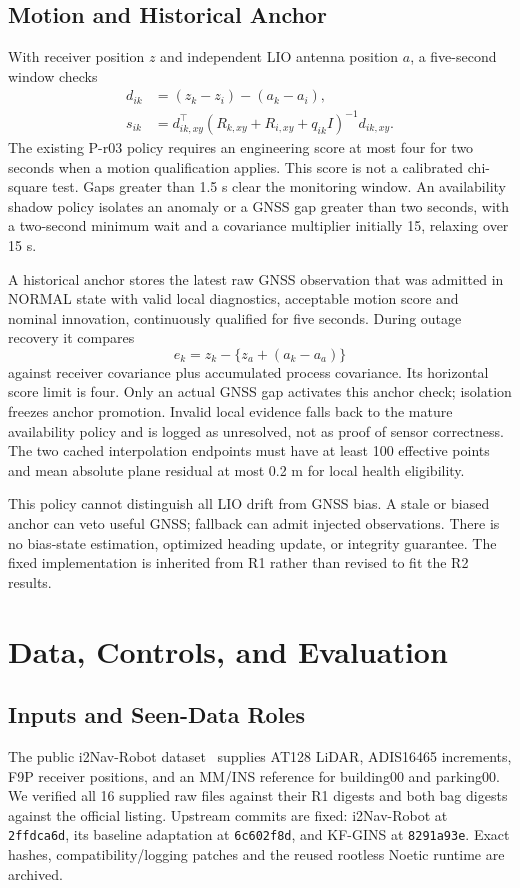 \documentclass[conference]{IEEEtran}
\begin{document}
\subsection{Motion and Historical Anchor}
With receiver position $z$ and independent LIO antenna position $a$, a five-second window checks
\begin{align}
 d_{ik}&=(z_k-z_i)-(a_k-a_i),\\
 s_{ik}&=d_{ik,xy}^{\top}(R_{k,xy}+R_{i,xy}+q_{ik}I)^{-1}d_{ik,xy}.
\end{align}
The existing P-r03 policy requires an engineering score at most four for two seconds when a motion qualification applies. This score is not a calibrated chi-square test. Gaps greater than 1.5 s clear the monitoring window. An availability shadow policy isolates an anomaly or a GNSS gap greater than two seconds, with a two-second minimum wait and a covariance multiplier initially 15, relaxing over 15 s.

A historical anchor stores the latest raw GNSS observation that was admitted in NORMAL state with valid local diagnostics, acceptable motion score and nominal innovation, continuously qualified for five seconds. During outage recovery it compares
\begin{equation}
 e_k=z_k-\{z_a+(a_k-a_a)\}
\end{equation}
against receiver covariance plus accumulated process covariance. Its horizontal score limit is four. Only an actual GNSS gap activates this anchor check; isolation freezes anchor promotion. Invalid local evidence falls back to the mature availability policy and is logged as unresolved, not as proof of sensor correctness. The two cached interpolation endpoints must have at least 100 effective points and mean absolute plane residual at most 0.2 m for local health eligibility.

This policy cannot distinguish all LIO drift from GNSS bias. A stale or biased anchor can veto useful GNSS; fallback can admit injected observations. There is no bias-state estimation, optimized heading update, or integrity guarantee. The fixed implementation is inherited from R1 rather than revised to fit the R2 results.

\section{Data, Controls, and Evaluation}
\subsection{Inputs and Seen-Data Roles}
The public i2Nav-Robot dataset~\cite{i2nav} supplies AT128 LiDAR, ADIS16465 increments, F9P receiver positions, and an MM/INS reference for building00 and parking00. We verified all 16 supplied raw files against their R1 digests and both bag digests against the official listing. Upstream commits are fixed: i2Nav-Robot at \texttt{2ffdca6d}, its baseline adaptation at \texttt{6c602f8d}, and KF-GINS at \texttt{8291a93e}. Exact hashes, compatibility/logging patches and the reused rootless Noetic runtime are archived.
\end{document}
